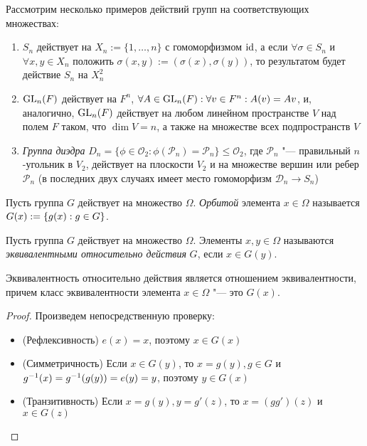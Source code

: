 \begin{example}
	Рассмотрим несколько примеров действий групп на соответствующих множествах:
	\begin{enumerate}
		\item $S_n$ действует на $X_n := \{1, \dotsc, n\}$ с гомоморфизмом $\operatorname{id}$, а если $\forall \sigma \in S_n$ и $\forall x, y \in X_n$ положить $\sigma(x, y) := (\sigma(x), \sigma(y))$, то результатом будет действие $S_n$ на $X_n^2$
		\item $\operatorname{GL}_n(F)$ действует на $F^n$, $\forall A \in \GL_n(F): \forall v \in F^n: A(v) \hm= Av$, и, аналогично, $\operatorname{GL}_n(F)$ действует на любом линейном пространстве $V$ над полем $F$ таком, что $\dim{V} = n$, а также на множестве всех подпространств $V$
		\item \textit{Группа диэдра} $D_n = \{\phi \in \mathcal{O}_2: \phi(\mathcal{P}_n) = \mathcal{P}_n\} \le \mathcal{O}_2$, где $\mathcal{P}_n$ "--- правильный $n$-угольник в $V_2$, действует на плоскости $V_2$ и на множестве вершин или ребер $\mathcal{P}_n$ (в последних двух случаях имеет место гомоморфизм $\mathcal{D}_n \to S_n$)
	\end{enumerate}
\end{example}

\begin{definition}
	Пусть группа $G$ действует на множество $\Omega$. \textit{Орбитой} элемента $x \in \Omega$ называется $G(x) := \{g(x): g \hm\in G\}$.
\end{definition}

\begin{definition}
	Пусть группа $G$ действует на множество $\Omega$. Элементы $x, y \in \Omega$ называются \textit{эквивалентными относительно действия} $G$, если $x \in G(y)$.
\end{definition}

\begin{proposition}
	Эквивалентность относительно действия является отношением эквивалентности, причем класс эквивалентности элемента $x \in \Omega$ "--- это $G(x)$.
\end{proposition}

\begin{proof}
	Произведем непосредственную проверку:
	\begin{itemize}
		\item (Рефлексивность) $e(x) = x$, поэтому $x \in G(x)$
		
		\item (Симметричность) Если $x \in G(y)$, то $x = g(y), g \in G$ и $g^{-1}(x) \hm= g^{-1}(g(y)) = e(y) = y$, поэтому $y \in G(x)$
		
		\item (Транзитивность) Если $x = g(y), y = g'(z)$, то $x = (gg')(z)$ и $x \in G(z)$
	\end{itemize}
\end{proof}


